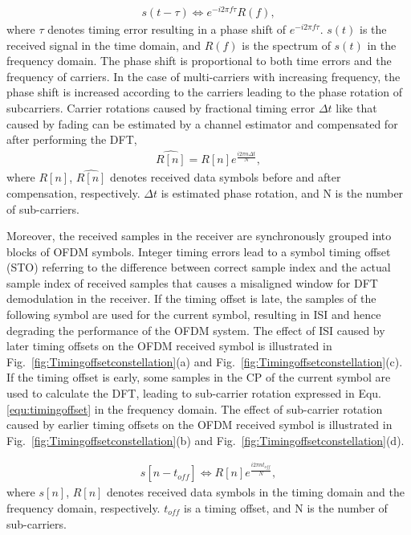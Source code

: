 \begin{eqnarray}
\label{equ:timingoffset}
               s (t - \tau )   \Leftrightarrow  e^{-i2\pi f\tau} R(f),
\end{eqnarray}	
where $\tau$ denotes timing error resulting in a phase shift of $e^{-i2\pi f\tau}$. 
$s(t)$ is the received signal in the time domain, and $R(f)$ is the spectrum of $s(t)$ in the frequency domain.
The phase shift is proportional to both time errors and the frequency of carriers.
In the case of multi-carriers with increasing frequency, the phase shift is increased according to the carriers leading to the phase rotation of subcarriers.
Carrier rotations caused by fractional timing error $\Delta t$ like that caused by fading can be estimated by a channel estimator and compensated for after performing the DFT,
\begin{eqnarray}
\label{equ:rotationcompensation}
               \widehat{R[n]} = R[n] e^{\frac{i2\pi n \Delta  t}{N}},
\end{eqnarray}
where $R[n]$, $\widehat{R[n]}$ denotes received data symbols before and after compensation, respectively. $\Delta t$ is estimated phase rotation, and N is the number of sub-carriers.

Moreover, the received samples in the receiver are synchronously grouped into blocks of OFDM symbols.
Integer timing errors lead to a symbol timing offset (STO) referring to the difference between correct sample index and the actual sample index of received samples that causes a misaligned window for DFT demodulation in the receiver.
If the timing offset is late, the samples of the following symbol are used for the current symbol, resulting in ISI and hence degrading the performance of the OFDM system. The effect of ISI caused by later timing offsets on the OFDM received symbol is illustrated in Fig.~\ref{fig:Timingoffsetconstellation}(a) and Fig.~\ref{fig:Timingoffsetconstellation}(c).
If the timing offset is early, some samples in the CP of the current symbol are used to calculate the DFT, leading to sub-carrier rotation expressed in Equ.\ref{equ:timingoffset} in the frequency domain.  
The effect of sub-carrier rotation caused by earlier timing offsets on the OFDM received symbol is illustrated in Fig.~\ref{fig:Timingoffsetconstellation}(b) and Fig.~\ref{fig:Timingoffsetconstellation}(d).

\begin{eqnarray}
\label{equ:rotationcompensation}
              s[n - \mathit{t_{off}}]  \Leftrightarrow R[n] e^{\frac{i2\pi n \mathit{t_{off}}}{N}},
\end{eqnarray}
where $s[n]$, $R[n]$ denotes received data symbols in the timing domain and the frequency domain, respectively. $\mathit{t_{off}}$ is a timing offset, and N is the number of sub-carriers.

